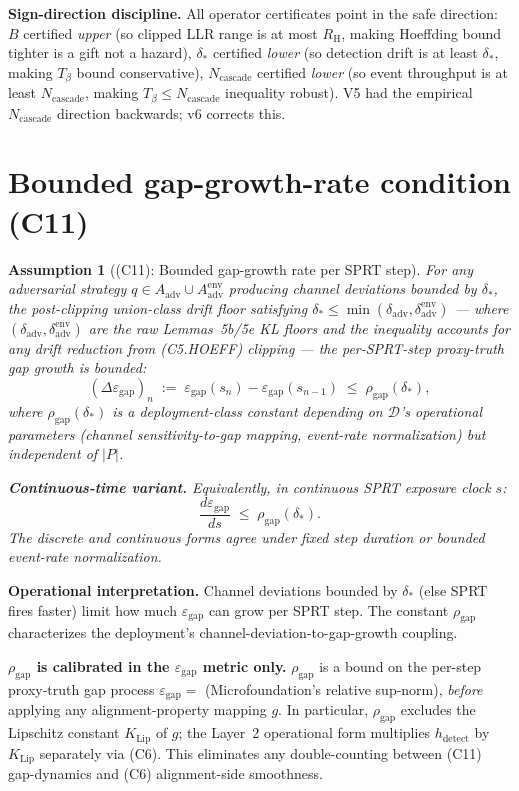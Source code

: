 \documentclass{article}
\newtheorem{assumption}{Assumption}
\newcommand{\Aadv}{A_{\mathrm{adv}}}
\newcommand{\deltaadv}{\delta_{\mathrm{adv}}}
\newcommand{\deltastar}{\delta_{*}}
\newcommand{\rhogap}{\rho_{\mathrm{gap}}}
\newcommand{\epsgap}{\varepsilon_{\mathrm{gap}}}
\newcommand{\Tbeta}{T_{\beta}}
\newcommand{\Ncasc}{N_{\mathrm{cascade}}}
\newcommand{\Bclip}{B}
\newcommand{\Rh}{R_{\mathrm{H}}}
\begin{document}
\textbf{Sign-direction discipline.}  All operator certificates point
in the safe direction: $\Bclip$ certified \emph{upper} (so clipped
LLR range is at most $\Rh$, making Hoeffding bound tighter is a gift
not a hazard), $\deltastar$ certified \emph{lower} (so detection
drift is at least $\deltastar$, making $\Tbeta$ bound conservative),
$\Ncasc$ certified \emph{lower} (so event throughput is at least
$\Ncasc$, making $\Tbeta \leq \Ncasc$ inequality robust).  V5 had
the empirical $\Ncasc$ direction backwards; v6 corrects this.

\section{Bounded gap-growth-rate condition (C11)}

\begin{assumption}[(C11): Bounded gap-growth rate per SPRT step]
\label{ass:C11}
For any adversarial strategy $q \in \Aadv \cup
\Aadv^{\mathrm{env}}$ producing channel deviations bounded by
$\deltastar$, the post-clipping union-class drift floor satisfying
$\deltastar \leq \min(\deltaadv,
\delta_{\mathrm{adv}}^{\mathrm{env}})$ — where $(\deltaadv,
\delta_{\mathrm{adv}}^{\mathrm{env}})$ are the raw Lemmas~5b/5e
KL floors and the inequality accounts for any drift reduction from
(C5.HOEFF) clipping — the per-SPRT-step proxy-truth gap growth is
bounded:
\[
  (\Delta \epsgap)_n \;:=\; \epsgap(s_n) - \epsgap(s_{n-1}) \;\leq\;
  \rhogap(\deltastar),
\]
where $\rhogap(\deltastar)$ is a deployment-class constant
depending on $\mathcal{D}$'s operational parameters (channel
sensitivity-to-gap mapping, event-rate normalization) but
independent of $|P|$.

\textbf{Continuous-time variant.}  Equivalently, in continuous
SPRT exposure clock $s$:
\[
  \frac{d \epsgap}{ds} \;\leq\; \rhogap(\deltastar).
\]
The discrete and continuous forms agree under fixed step duration
or bounded event-rate normalization.
\end{assumption}

\textbf{Operational interpretation.}  Channel deviations bounded by
$\deltastar$ (else SPRT fires faster) limit how much $\epsgap$ can
grow per SPRT step.  The constant $\rhogap$ characterizes the
deployment's channel-deviation-to-gap-growth coupling.

\textbf{$\rhogap$ is calibrated in the $\epsgap$ metric only.}
$\rhogap$ is a bound on the per-step proxy-truth gap process
$\epsgap = $ (Microfoundation's relative sup-norm), \emph{before}
applying any alignment-property mapping $g$.  In particular,
$\rhogap$ excludes the Lipschitz constant $K_{\mathrm{Lip}}$ of $g$;
the Layer~2 operational form multiplies $h_{\mathrm{detect}}$ by
$K_{\mathrm{Lip}}$ separately via (C6).  This eliminates any
double-counting between (C11) gap-dynamics and (C6) alignment-side
smoothness.
\end{document}
